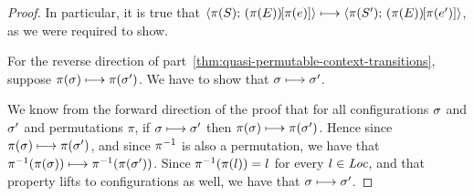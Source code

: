 \begin{proof}
  In particular, it is true that
  $\langle \pi(S);\, (\pi(E))\hspace{-1mm}\left[\pi(e)\right] \rangle \longmapsto
  \langle \pi(S');\, (\pi(E))\hspace{-1mm}\left[\pi(e')\right] \rangle$, as we were required
  to show.

  For the reverse direction of
  part~\ref{thm:quasi-permutable-context-transitions}, suppose
  $\pi(\sigma) \longmapsto \pi(\sigma')$.  We have to show that $\sigma
  \longmapsto \sigma'$.

  We know from the forward direction of the proof that for all
  configurations $\sigma$ and $\sigma'$ and permutations $\pi$, if
  $\sigma \longmapsto \sigma'$ then $\pi(\sigma) \longmapsto
  \pi(\sigma')$.  Hence since $\pi(\sigma) \longmapsto \pi(\sigma')$, and
  since $\pi^{-1}$ is also a permutation, we have that
  $\pi^{-1}(\pi(\sigma)) \longmapsto \pi^{-1}(\pi(\sigma'))$.  Since
  $\pi^{-1}(\pi(l)) = l$ for every $l \in \mathit{Loc}$, and that property lifts
  to configurations as well, we have that $\sigma \longmapsto \sigma'$.

\end{proof}
